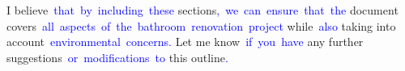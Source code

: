 \documentclass{article}
\begin{document}
\begin{tcolorbox}[colframe=black,colback=white]
{}I believe\textcolor{blue}{~that}\textcolor{blue}{~by}\textcolor{blue}{~including}\textcolor{blue}{~these} sections\textcolor{blue}{,}\textcolor{blue}{~we}\textcolor{blue}{~can}\textcolor{blue}{~ensure}\textcolor{blue}{~that}\textcolor{blue}{~the} document covers\textcolor{blue}{~all}\textcolor{blue}{~aspects}\textcolor{blue}{~of}\textcolor{blue}{~the}\textcolor{blue}{~bathroom}\textcolor{blue}{~renovation}\textcolor{blue}{~project} while\textcolor{blue}{~also} taking into account\textcolor{blue}{~environmental}\textcolor{blue}{~concerns}\textcolor{blue}{.} Let me know\textcolor{blue}{~if}\textcolor{blue}{~you}\textcolor{blue}{~have} any further suggestions\textcolor{blue}{~or}\textcolor{blue}{~modifications}\textcolor{blue}{~to} this outline\textcolor{blue}{.}\textcolor{blue}{}
\end{tcolorbox}
\end{document}
